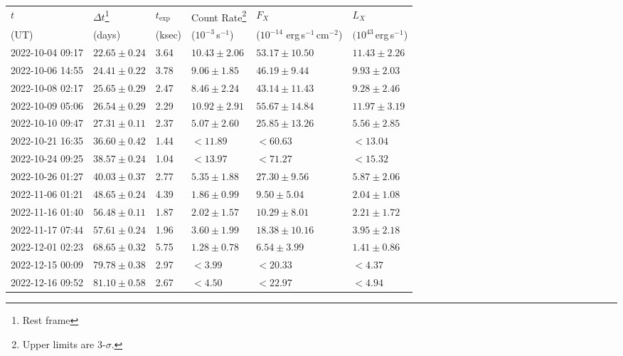 \documentclass{nature_plusfigure}
\newcommand{\at}{AT2022tsd}
\begin{document}
\begin{supplement}
\begin{table*} 
\centering 
\begin{tabular}{llllll}
\hline\hline
$t$ & $\Delta t$\footnote{Rest frame} & $t_\mathrm{exp}$ & Count Rate\footnote{Upper limits are 3-$\sigma$.} & $F_X$ & $L_X$ \\ 
(UT) & (days) & (ksec) & ($10^{-3}$\,s$^{-1}$) & ($10^{-14}$ erg\,s$^{-1}$\,cm$^{-2}$) & $(10^{43}$\,erg\,s$^{-1}$) \\ 
\hline
2022-10-04 09:17 & $22.65\pm0.24$ & 3.64 & $10.43\pm2.06$ & $53.17\pm10.50$ & $11.43\pm2.26$  \\ 
2022-10-06 14:55 & $24.41\pm0.22$ & 3.78 & $9.06\pm1.85$ & $46.19\pm9.44$ & $9.93\pm2.03$  \\ 
2022-10-08 02:17 & $25.65\pm0.29$ & 2.47 & $8.46\pm2.24$ & $43.14\pm11.43$ & $9.28\pm2.46$  \\ 
2022-10-09 05:06 & $26.54\pm0.29$ & 2.29 & $10.92\pm2.91$ & $55.67\pm14.84$ & $11.97\pm3.19$  \\ 
2022-10-10 09:47 & $27.31\pm0.11$ & 2.37 & $5.07\pm2.60$ & $25.85\pm13.26$ & $5.56\pm2.85$  \\ 
2022-10-21 16:35 & $36.60\pm0.42$ & 1.44 & $<11.89$ & $<60.63$ & $<13.04$  \\ 
2022-10-24 09:25 & $38.57\pm0.24$ & 1.04 & $<13.97$ & $<71.27$ & $<15.32$  \\ 
2022-10-26 01:27 & $40.03\pm0.37$ & 2.77 & $5.35\pm1.88$ & $27.30\pm9.56$ & $5.87\pm2.06$  \\ 
2022-11-06 01:21 & $48.65\pm0.24$ & 4.39 & $1.86\pm0.99$ & $9.50\pm5.04$ & $2.04\pm1.08$  \\ 
2022-11-16 01:40 & $56.48\pm0.11$ & 1.87 & $2.02\pm1.57$ & $10.29\pm8.01$ & $2.21\pm1.72$  \\ 
2022-11-17 07:44 & $57.61\pm0.24$ & 1.96 & $3.60\pm1.99$ & $18.38\pm10.16$ & $3.95\pm2.18$  \\ 
2022-12-01 02:23 & $68.65\pm0.32$ & 5.75 & $1.28\pm0.78$ & $6.54\pm3.99$ & $1.41\pm0.86$  \\ 
2022-12-15 00:09 & $79.78\pm0.38$ & 2.97 & $<3.99$ & $<20.33$ & $<4.37$  \\ 
2022-12-16 09:52 & $81.10\pm0.58$ & 2.67 & $<4.50$ & $<22.97$ & $<4.94$  \\ 
\hline 
\end{tabular} 
\caption{Swift XRT observations of \at.} 
\label{tab:xray-observations} 
\end{table*} 


\end{supplement}
\end{document}
